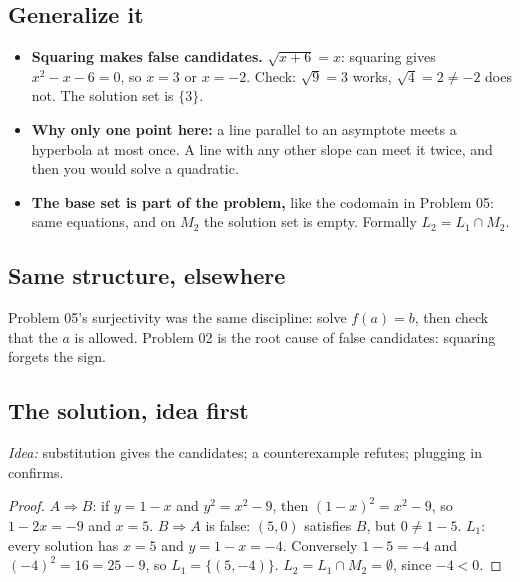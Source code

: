 \documentclass{kaelearn}
\begin{document}
\subsection{Generalize it}
\begin{itemize}
  \item \textbf{Squaring makes false candidates.} $\sqrt{x+6}=x$: squaring gives $x^2-x-6=0$, so $x=3$ or $x=-2$.
        Check: $\sqrt9=3$ works, $\sqrt4=2\neq-2$ does not. The solution set is $\{3\}$.
  \item \textbf{Why only one point here:} a line parallel to an asymptote meets a hyperbola at most once. A line
        with any other slope can meet it twice, and then you would solve a quadratic.
  \item \textbf{The base set is part of the problem,} like the codomain in Problem 05: same equations, and on $M_2$
        the solution set is empty. Formally $L_2=L_1\cap M_2$.
\end{itemize}

\subsection{Same structure, elsewhere}
Problem 05's surjectivity was the same discipline: solve $f(a)=b$, then check that the $a$ is allowed. Problem 02 is
the root cause of false candidates: squaring forgets the sign.



\subsection{The solution, idea first}
\emph{Idea:} substitution gives the candidates; a counterexample refutes; plugging in confirms.
\begin{proof}
$A\Rightarrow B$: if $y=1-x$ and $y^2=x^2-9$, then $(1-x)^2=x^2-9$, so $1-2x=-9$ and $x=5$.
$B\Rightarrow A$ is false: $(5,0)$ satisfies $B$, but $0\neq1-5$.
$L_1$: every solution has $x=5$ and $y=1-x=-4$. Conversely $1-5=-4$ and $(-4)^2=16=25-9$, so $L_1=\{(5,-4)\}$.
$L_2=L_1\cap M_2=\emptyset$, since $-4<0$.
\end{proof}
\end{document}
